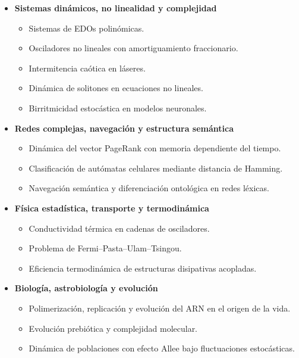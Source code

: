 \documentclass[11pt,a4paper]{article}
\begin{document}
\begin{itemize}[leftmargin=*]

    \item \textbf{Sistemas dinámicos, no linealidad y complejidad}
    \begin{itemize}
        \item Sistemas de EDOs polinómicas.
        \item Osciladores no lineales con amortiguamiento fraccionario.
        \item Intermitencia caótica en láseres.
        \item Dinámica de solitones en ecuaciones no lineales.
        \item Birritmicidad estocástica en modelos neuronales.
    \end{itemize}

    \item \textbf{Redes complejas, navegación y estructura semántica}
    \begin{itemize}
        \item Dinámica del vector PageRank con memoria dependiente del tiempo.
        \item Clasificación de autómatas celulares mediante distancia de Hamming.
        \item Navegación semántica y diferenciación ontológica en redes léxicas.
    \end{itemize}

    \item \textbf{Física estadística, transporte y termodinámica}
    \begin{itemize}
        \item Conductividad térmica en cadenas de osciladores.
        \item Problema de Fermi--Pasta--Ulam--Tsingou.
        \item Eficiencia termodinámica de estructuras disipativas acopladas.
    \end{itemize}

    \item \textbf{Biología, astrobiología y evolución}
    \begin{itemize}
        \item Polimerización, replicación y evolución del ARN en el origen de la vida.
        \item Evolución prebiótica y complejidad molecular.
        \item Dinámica de poblaciones con efecto Allee bajo fluctuaciones estocásticas.
    \end{itemize}


\end{itemize}
\end{document}
